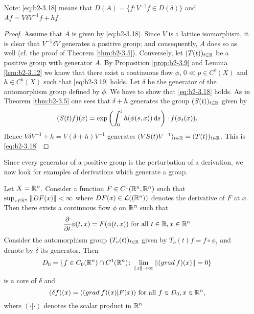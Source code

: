 Note: \eqref{eq:b2-3.18} means that $D(A) = \{ f \colon V^{-1}f \in D(\delta) \}$ and $Af = V\delta V^{-1}f + hf$.
\begin{proof}
Assume that $A$ is given by \eqref{eq:b2-3.18}.
Since $V$ is a lattice isomorphism, it is clear that $V^{-1}\delta V$ generates a positive group; and consequently, $A$ does so as well (cf. the proof of Theorem \ref{thm:b2-3.5}).
Conversely, let $(T(t))_{t \in \mathbb{R}}$ be a positive group with generator $A$.
By Proposition \ref{prop:b2-3.9} and Lemma \ref{lem:b2-3.12} we know that there exist a continuous flow $\phi$, $0 \ll p \in C^{b}(X)$ and $h \in C^{b}(X)$ such that \eqref{eq:b2-3.19} holds.
Let $\delta$ be the generator of the automorphism group defined by $\phi$.
We have to show that \eqref{eq:b2-3.18} holds.
As in Theorem \ref{thm:b2-3.5} one sees that $\delta + h$ generates the group $(S(t))_{t \in \mathbb{R}}$ given by 
\[
(S(t)f)(x) = \exp\left(\int_{0}^{t} h(\phi(s,x)) \mathop{}\!\mathrm{d}{s} \right) \cdot f(\phi_{t}(x)).
\]
Hence $V\delta V^{-1} + h = V(\delta + h)V^{-1}$ generates $(VS(t)V^{-1})_{t \in \mathbb{R}} = (T(t))_{t \in \mathbb{R}}$.
This is \eqref{eq:b2-3.18}.
\end{proof}
Since every generator of a positive group is the perturbation of a derivation, we now look for examples of derivations which generate a group.
\begin{example}\label{ex:b2-3.15}
Let $X = \mathbb{R}^{n}$.
Consider a function $F \in C^{1}(\mathbb{R}^{n},\mathbb{R}^{n})$ such that $\sup_{x \in \mathbb{R}^{n}} \|DF(x)\| < \infty$ where $DF(x) \in \mathcal{L}((\mathbb{R}^{n}))$ denotes the derivative of $F$ at $x$.
Then there exists a continuous flow $\phi$ on $\mathbb{R}^{n}$ such that
\begin{equation}\label{eq:b2-3.20}
\frac{\partial}{\partial t} \phi(t,x) = F(\phi(t,x)) \text{ for all } t \in \mathbb{R}, x \in \mathbb{R}^{n}
\end{equation}
Consider the automorphism group $(T_{o}(t))_{t \in \mathbb{R}}$ given by $T_{o}(t)f = f \circ \phi_{t}$
and denote by $\delta$ its generator.
Then 
\[D_{0} = \{ f \in C_{0}(\mathbb{R}^{n}) \cap C^{1}(\mathbb{R}^{n}) \colon \lim_{\|x\| \to \infty} \|(grad\: f)(x)\| = 0 \}
\]
is a core of $\delta$ and
\begin{equation}\label{eq:b2-3.21}
(\delta f)(x) = ((grad\: f)(x) | F(x)) \text{ for all } f \in D_{0}, x \in \mathbb{R}^{n},
\end{equation}
where $(\cdot|\cdot)$ denotes the scalar product in $\mathbb{R}^{n}$
\end{example}
